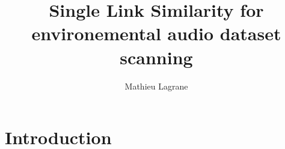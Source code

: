 \documentclass[a4paper, 11pt]{article}
\begin{document}
\title{Single Link Similarity for environemental audio dataset scanning}
\author{Mathieu Lagrane}
\date{}

\maketitle

\tableofcontents

\section{Introduction}





\end{document}
